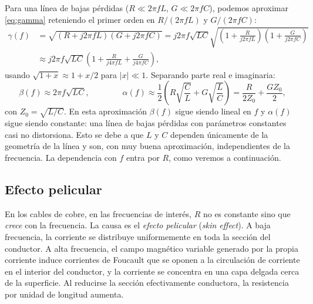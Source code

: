 Para una línea de bajas pérdidas ($R\ll 2\pi f L$, $G\ll 2\pi f C$), podemos aproximar \eqref{eq:gamma} reteniendo el primer orden en $R/(2\pi f L)$ y $G/(2\pi f C)$:
\begin{align*}
    \gamma(f) &= \sqrt{(R+j2\pi f L)(G+j2\pi f C)} = j2\pi f\sqrt{LC}\sqrt{\left(1+\frac{R}{j2\pi f L}\right)\left(1+\frac{G}{j2\pi f C}\right)} \\ &\approx j2\pi f\sqrt{LC}\left(1+\frac{R}{j4\pi f L}+\frac{G}{j4\pi f C}\right),
\end{align*}
usando $\sqrt{1+x}\approx 1+x/2$ para $|x|\ll 1$. Separando parte real e imaginaria:
\begin{equation}\label{eq:beta aproximado}
    \beta(f) \approx 2\pi f\sqrt{LC}, \qquad\qquad \alpha(f) \approx \frac{1}{2}\left(R\sqrt{\frac{C}{L}}+G\sqrt{\frac{L}{C}}\right) = \frac{R}{2Z_0}+\frac{G Z_0}{2},
\end{equation}
con $Z_0=\sqrt{L/C}$. En esta aproximación $\beta(f)$ sigue siendo lineal en $f$ y $\alpha(f)$ sigue siendo constante: una línea de bajas pérdidas con parámetros constantes casi no distorsiona. Esto se debe a que $L$ y $C$ dependen únicamente de la geometría de la línea y son, con muy buena aproximación, independientes de la frecuencia. La dependencia con $f$ entra por $R$, como veremos a continuación.

\subsection*{Efecto pelicular}

En los cables de cobre, en las frecuencias de interés, $R$ no es constante sino que \emph{crece} con la frecuencia. La causa es el \emph{efecto pelicular} (\emph{skin effect}). A baja frecuencia, la corriente se distribuye uniformemente en toda la sección del conductor. A alta frecuencia, el campo magnético variable generado por la propia corriente induce corrientes de Foucault que se oponen a la circulación de corriente en el interior del conductor, y la corriente se concentra en una capa delgada cerca de la superficie. Al reducirse la sección efectivamente conductora, la resistencia por unidad de longitud aumenta.

